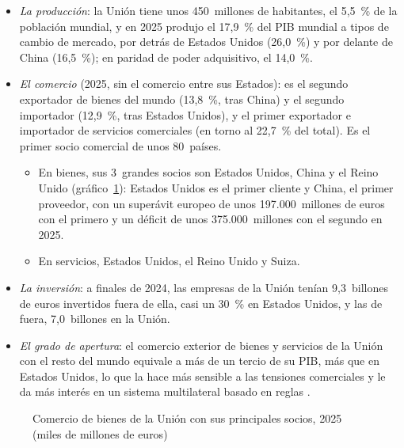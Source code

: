 \documentclass[11pt]{article}
\begin{document}
\begin{itemize}
\item \emph{La producción}: la Unión tiene unos 450~millones de habitantes, el 5,5~\% de la población mundial, y en 2025 produjo el 17,9~\% del PIB mundial a tipos de cambio de mercado, por detrás de Estados Unidos (26,0~\%) y por delante de China (16,5~\%); en paridad de poder adquisitivo, el 14,0~\%\nocite{BancoMundial2026PIB}.
\item \emph{El comercio} (2025, sin el comercio entre sus Estados): es el segundo exportador de bienes del mundo (13,8~\%, tras China) y el segundo importador (12,9~\%, tras Estados Unidos), y el primer exportador e importador de servicios comerciales (en torno al 22,7~\% del total)\nocite{OMC2026Estadisticas}. Es el primer socio comercial de unos 80~países\nocite{CE2026PosicionComercio}.
  \begin{itemize}
  \item En bienes, sus 3~grandes socios son Estados Unidos, China y el Reino Unido (gráfico~\ref{fig:comercio-socios}): Estados Unidos es el primer cliente y China, el primer proveedor, con un superávit europeo de unos 197.000~millones de euros con el primero y un déficit de unos 375.000~millones con el segundo en 2025.
  \item En servicios, Estados Unidos, el Reino Unido y Suiza.
  \end{itemize}
\item \emph{La inversión}: a finales de 2024, las empresas de la Unión tenían 9,3~billones de euros invertidos fuera de ella, casi un 30~\% en Estados Unidos, y las de fuera, 7,0~billones en la Unión\nocite{Eurostat2025IED}.
\item \emph{El grado de apertura}: el comercio exterior de bienes y servicios de la Unión con el resto del mundo equivale a más de un tercio de su PIB, más que en Estados Unidos, lo que la hace más sensible a las tensiones comerciales y le da más interés en un sistema multilateral basado en reglas .
\end{itemize}

\begin{figure}[H]
\centering
\caption{Comercio de bienes de la Unión con sus principales socios, 2025 (miles de millones de euros)}\label{fig:comercio-socios}
\end{figure}
\end{document}
